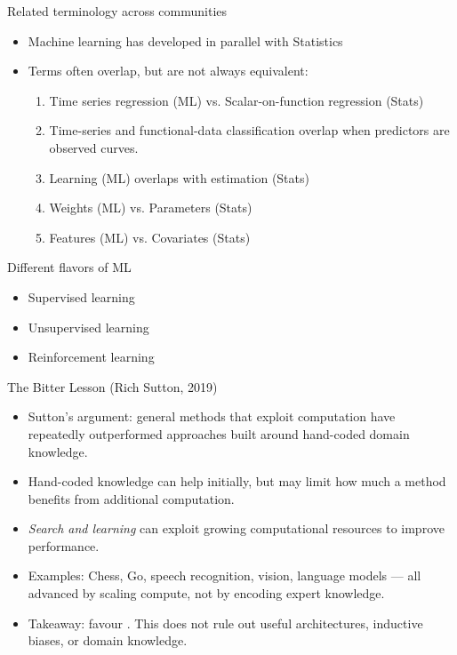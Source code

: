 \documentclass[10pt]{beamer}
\begin{document}
\begin{frame}{Related terminology across communities}

\begin{itemize}
\item Machine learning has developed in parallel with Statistics
\item Terms often overlap, but are not always equivalent:
\begin{enumerate}
\item Time series regression (ML) vs. Scalar-on-function
regression (Stats)\pause
\item Time-series and functional-data classification overlap when predictors are observed curves.\pause
\item Learning (ML) overlaps with estimation (Stats)\pause
\item Weights (ML) vs. Parameters (Stats)\pause
\item Features (ML) vs. Covariates (Stats)
\end{enumerate}

\end{itemize}

\end{frame}


\begin{frame}{Different flavors of ML}

\begin{itemize}
\item Supervised learning
\item Unsupervised learning
\item Reinforcement learning
\end{itemize}

\end{frame}

\begin{frame}{The Bitter Lesson (Rich Sutton, 2019)}

\begin{itemize}
\item Sutton's argument: general methods that exploit computation have repeatedly outperformed approaches built around hand-coded domain knowledge.
\pause
\item Hand-coded knowledge can help initially, but may limit how much a method benefits from additional computation.
\pause
\item \emph{Search and learning} can exploit growing computational resources to improve performance.
\pause
\item Examples: Chess, Go, speech recognition, vision, language models — all advanced by scaling compute, not by encoding expert knowledge.
\pause
\item Takeaway: favour . This does not rule out useful architectures, inductive biases, or domain knowledge.
\end{itemize}

\end{frame}
\end{document}

